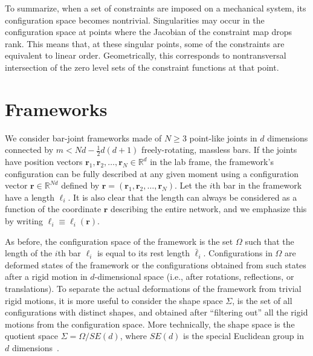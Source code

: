 

To summarize, when a set of constraints are imposed on a mechanical system, its configuration space becomes nontrivial.
Singularities may occur in the configuration space at points where the Jacobian of the constraint map drops rank.
This means that, at these singular points, some of the constraints are equivalent to linear order.
Geometrically, this corresponds to nontransversal intersection of the zero level sets of the constraint functions at that point.

\section{Frameworks}

We consider bar-joint frameworks made of $N \geq 3$ point-like joints in $d$ dimensions connected by $m < Nd - \frac{1}{2}d(d+1)$ freely-rotating, massless bars.
If the joints have position vectors $\bm{r}_1, \bm{r}_2, \ldots, \bm{r}_{N} \in \mathbb{R}^d$ in the lab frame, the framework's configuration can be fully described at any given moment using a configuration vector $\bm{r}\in\mathbb{R}^{N d}$ defined by $\bm{r} = (\bm{r}_1, \bm{r}_2, \ldots, \bm{r}_{N})$.
Let the $i$th bar in the framework have a length $\ell_{i}$.
It is also clear that the length can always be considered as a function of the coordinate $\bm{r}$ describing the entire network, and we emphasize this by writing $\ell_i \equiv \ell_i(\bm{r})$.

As before, the configuration space of the framework is the set $\Omega$ such that the length of the $i$th bar $\ell_{i}$ is equal to its rest length $\bar{\ell}_{i}$.
Configurations in $\Omega$ are deformed states of the framework or the configurations obtained from such states after a rigid motion in $d$-dimensional space (i.e., after rotations, reflections, or translations).
To separate the actual deformations of the framework from trivial rigid motions, it is more useful to consider the shape space $\Sigma$, is the set of all configurations with distinct shapes, and
obtained after ``filtering out'' all the rigid motions from the configuration space.
More technically, the shape space is the quotient space $\Sigma = \Omega/SE(d)$, where $SE(d)$ is the special Euclidean group in $d$ dimensions~\cite{littlejohn1995}.

